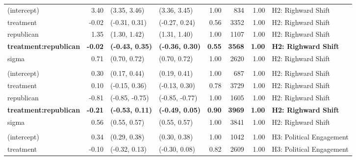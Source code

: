 \begin{table}[!h]
\begin{tabular}[t]{lrllrrrl}
\hspace{1em}(intercept) & 3.40 & (3.35, 3.46) & (3.36, 3.45) & 1.00 & 834 & 1.00 & H2: Righward Shift\\
\hspace{1em}treatment & -0.02 & (-0.31, 0.31) & (-0.27, 0.24) & 0.56 & 3352 & 1.00 & H2: Righward Shift\\
\hspace{1em}republican & 1.35 & (1.30, 1.42) & (1.31, 1.40) & 1.00 & 1107 & 1.00 & H2: Righward Shift\\
\hspace{1em}\textbf{treatment:republican} & \textbf{-0.02} & \textbf{(-0.43, 0.35)} & \textbf{(-0.36, 0.30)} & \textbf{0.55} & \textbf{3568} & \textbf{1.00} & \textbf{H2: Righward Shift}\\
\hspace{1em}sigma & 0.71 & (0.70, 0.72) & (0.70, 0.72) & 1.00 & 2620 & 1.00 & H2: Righward Shift\\
\addlinespace[0.3em]
\multicolumn{8}{l}{\textbf{Outcome: Obama approval}}\\
\hline
\hspace{1em}(intercept) & 0.30 & (0.17, 0.44) & (0.19, 0.41) & 1.00 & 687 & 1.00 & H2: Righward Shift\\
\hspace{1em}treatment & 0.10 & (-0.15, 0.36) & (-0.13, 0.30) & 0.78 & 3729 & 1.00 & H2: Righward Shift\\
\hspace{1em}republican & -0.81 & (-0.85, -0.75) & (-0.85, -0.77) & 1.00 & 1605 & 1.00 & H2: Righward Shift\\
\hspace{1em}\textbf{treatment:republican} & \textbf{-0.21} & \textbf{(-0.53, 0.11)} & \textbf{(-0.49, 0.05)} & \textbf{0.90} & \textbf{3969} & \textbf{1.00} & \textbf{H2: Righward Shift}\\
\hspace{1em}sigma & 0.56 & (0.55, 0.57) & (0.55, 0.57) & 1.00 & 3841 & 1.00 & H2: Righward Shift\\
\addlinespace[0.3em]
\multicolumn{8}{l}{\textbf{Outcome: political participation}}\\
\hline
\hspace{1em}(intercept) & 0.34 & (0.29, 0.38) & (0.30, 0.38) & 1.00 & 1042 & 1.00 & H3: Political Engagement\\
\hspace{1em}treatment & -0.10 & (-0.32, 0.13) & (-0.30, 0.08) & 0.82 & 2609 & 1.00 & H3: Political Engagement\\

\end{tabular}
\end{table}
